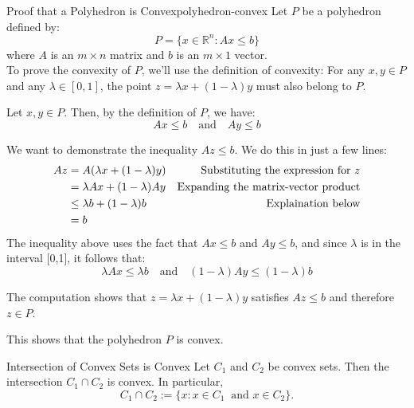 \begin{example}{Proof that a Polyhedron is Convex}{polyhedron-convex}
Let \( P \) be a polyhedron defined by:
\[ P = \{x \in \mathbb{R}^n : Ax \leq b\} \]
where \( A \) is an \( m \times n \) matrix and \( b \) is an \( m \times 1 \) vector.\\


To prove the convexity of \( P \), we'll use the definition of convexity: For any \( x, y \in P \) and any \( \lambda \in [0,1] \), the point \( z = \lambda x + (1-\lambda) y \) must also belong to \( P \).

Let \( x, y \in P \). Then, by the definition of \( P \), we have:
\[ Ax \leq b \ \ \ \text{ and } \ \ \  Ay \leq b \]

We want to demonstrate the inequality \( Az \leq b \). 
We do this in just a few lines:
\begin{align*}
Az &= A(\lambda x + (1-\lambda) y) & \text{Substituting the expression for \( z \)}\\
&=\lambda Ax + (1-\lambda) Ay & \text{Expanding the matrix-vector product}\\
&\leq \lambda b + (1-\lambda) b & \text{Explaination below}\\
& = b
\end{align*}
The inequality above
uses the fact that \( Ax \leq b \) and \( Ay \leq b \), and since \( \lambda \) is in the interval [0,1], it follows that:
\[ \lambda Ax \leq \lambda b  \ \ \ 
\text{ and } \ \ \ 
(1-\lambda) Ay \leq (1-\lambda) b \]


The computation shows that \( z = \lambda x + (1-\lambda) y \) satisfies \( Az \leq b \) and therefore \( z \in P \).

This shows that the polyhedron \( P \) is convex.
\end{example}

\begin{lemma}{Intersection of Convex Sets is Convex}{}
Let $C_1$ and $C_2$ be convex sets.  Then the intersection $C_1 \cap C_2$ is convex.  
In particular, 
$$C_1 \cap C_2 := \{ x :  x \in C_1 \ \text{ and } x \in C_2\}.
$$
\end{lemma}

